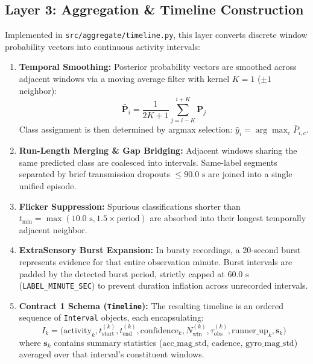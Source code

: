 \documentclass[11pt,a4paper]{article}
\begin{document}
\subsection{Layer 3: Aggregation \& Timeline Construction}
Implemented in \texttt{src/aggregate/timeline.py}, this layer converts discrete window probability vectors into continuous activity intervals:
\begin{enumerate}[leftmargin=1.5em,noitemsep,topsep=2pt]
  \item \textbf{Temporal Smoothing:} Posterior probability vectors are smoothed across adjacent windows via a moving average filter with kernel $K = 1$ ($\pm 1$ neighbor):
  \begin{equation}
    \bar{\mathbf{P}}_i = \frac{1}{2K+1} \sum_{j = i-K}^{i+K} \mathbf{P}_j
  \end{equation}
  Class assignment is then determined by argmax selection: $\hat{y}_i = \arg\max_{c} \bar{P}_{i, c}$.
  \item \textbf{Run-Length Merging \& Gap Bridging:} Adjacent windows sharing the same predicted class are coalesced into intervals. Same-label segments separated by brief transmission dropouts $\le 90.0\text{ s}$ are joined into a single unified episode.
  \item \textbf{Flicker Suppression:} Spurious classifications shorter than $t_{\text{min}} = \max(10.0\text{ s}, 1.5 \times \text{period})$ are absorbed into their longest temporally adjacent neighbor.
  \item \textbf{ExtraSensory Burst Expansion:} In bursty recordings, a 20-second burst represents evidence for that entire observation minute. Burst intervals are padded by the detected burst period, strictly capped at $60.0\text{ s}$ (\texttt{LABEL\_MINUTE\_SEC}) to prevent duration inflation across unrecorded intervals.
  \item \textbf{Contract 1 Schema (\texttt{Timeline}):} The resulting timeline is an ordered sequence of \texttt{Interval} objects, each encapsulating:
  \begin{equation}
    I_k = \big( \text{activity}_k, t_{\text{start}}^{(k)}, t_{\text{end}}^{(k)}, \text{confidence}_k, N_{\text{win}}^{(k)}, \tau_{\text{obs}}^{(k)}, \text{runner\_up}_k, \mathbf{s}_k \big)
  \end{equation}
  where $\mathbf{s}_k$ contains summary statistics ($\text{acc\_mag\_std}$, $\text{cadence}$, $\text{gyro\_mag\_std}$) averaged over that interval's constituent windows.
\end{enumerate}
\end{document}
